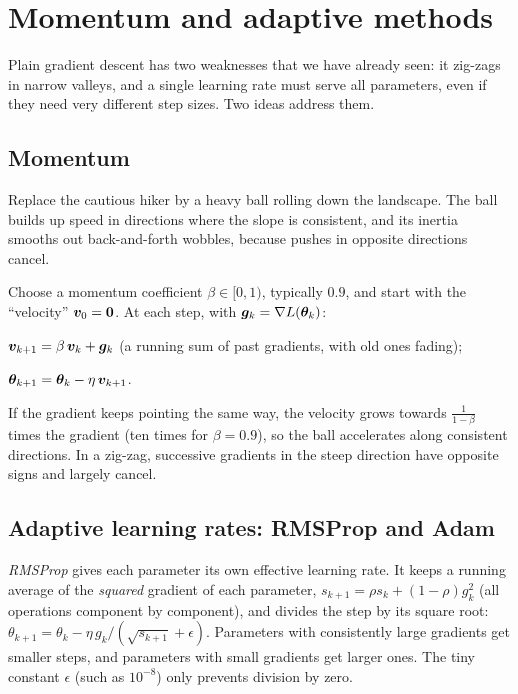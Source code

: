 \section{Momentum and adaptive methods}\label{sec:momentum-adam}

Plain gradient descent has two weaknesses that we have already seen: it
zig-zags in narrow valleys, and a single learning rate must serve all parameters,
even if they need very different step sizes. Two ideas address them.

\subsection{Momentum}

\begin{picturethis}
Replace the cautious hiker by a heavy ball rolling down the landscape. The ball
builds up speed in directions where the slope is consistent, and its inertia
smooths out back-and-forth wobbles, because pushes in opposite directions cancel.
\end{picturethis}

\begin{algorithm}\label{alg:momentum}
Choose a momentum coefficient $\beta \in [0, 1)$, typically $0.9$, and start with
the ``velocity'' $\bm{v}_0 = \bm{0}$. At each step, with $\bm{g}_k = \nabla L(\bm{\theta}_k)$:
\begin{steps}
  \item $\bm{v}_{k+1} = \beta\,\bm{v}_k + \bm{g}_k$ \quad (a running sum of past gradients,
    with old ones fading);
  \item $\bm{\theta}_{k+1} = \bm{\theta}_k - \eta\,\bm{v}_{k+1}$.
\end{steps}
\end{algorithm}

If the gradient keeps pointing the same way, the velocity grows towards
$\frac{1}{1 - \beta}$ times the gradient (ten times for $\beta = 0.9$), so the ball
accelerates along consistent directions. In a zig-zag, successive gradients in
the steep direction have opposite signs and largely cancel.

\subsection{Adaptive learning rates: RMSProp and Adam}

\emph{RMSProp} gives each parameter its own effective learning rate. It keeps
a running average of the \emph{squared} gradient of each parameter,
$s_{k+1} = \rho s_k + (1 - \rho)g_k^2$ (all operations component by component),
and divides the step by its square root:
$\theta_{k+1} = \theta_k - \eta\,g_k/(\sqrt{s_{k+1}} + \epsilon)$. Parameters with
consistently large gradients get smaller steps, and parameters with small
gradients get larger ones. The tiny constant $\epsilon$ (such as $10^{-8}$) only
prevents division by zero.

